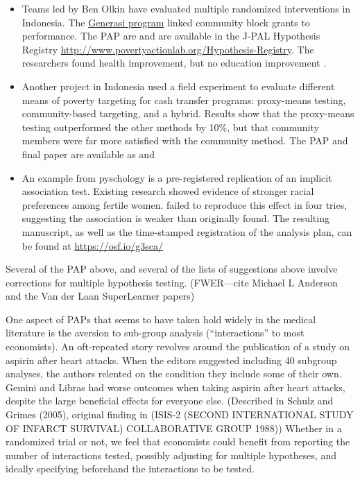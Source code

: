 \documentclass[12pt] {article}
\begin{document}
\begin{itemize}
\item 
Teams led by Ben Olkin have evaluated multiple randomized interventions in Indonesia. The \href{http://www.povertyactionlab.org/evaluation/project-generasi-conditional-community-block-grants-indonesia}{Generasi program} linked community block grants to performance. The PAP are \cite{olken_generasi_2009, olken_generasi_2010} and are available in the J-PAL Hypothesis Registry \url{http://www.povertyactionlab.org/Hypothesis-Registry}. The researchers found health improvement, but no education improvement \cite{olken_indonesias_2010, olken_should_2014}.

\item 
Another project in Indonesia used a field experiment to evaluate different means of poverty targeting for cash transfer programs: proxy-means testing, community-based targeting, and a hybrid. Results show that the proxy-means testing outperformed the other methods by 10\%, but that community members were far more satisfied with the community method. The PAP and final paper are available as \cite{olken_targeting_2009} and \cite{alatas_targeting_2012}

\item
An example from pyschology is a pre-registered replication of an implicit association test. Existing research showed evidence of stronger racial preferences among fertile women. \cite{NosekPreRegistered} failed to reproduce this effect in four tries, suggesting the association is weaker than originally found. The resulting manuscript, as well as the time-stamped registration of the analysis plan, can be found at \url{https://osf.io/g3sca/}
\end{itemize}

Several of the PAP above, and several of the lists of suggestions above involve corrections for multiple hypothesis testing.  (FWER---cite Michael L Anderson
and the Van der Laan SuperLearner papers)

One aspect of PAPs that seems to have taken hold widely in the medical
literature is the aversion to sub-group analysis (``interactions'' to
most economists). An oft-repeated story revolves around the publication
of a study on aspirin after heart attacks. When the editors suggested
including 40 subgroup analyses, the authors relented on the condition
they include some of their own. Gemini and Libras had worse outcomes
when taking aspirin after heart attacks, despite the large beneficial
effects for everyone else. (Described in Schulz and Grimes (2005),
original finding in (ISIS-2 (SECOND INTERNATIONAL STUDY OF INFARCT
SURVIVAL) COLLABORATIVE GROUP 1988)) Whether in a randomized trial or
not, we feel that economists could benefit from reporting the number of
interactions tested, possibly adjusting for multiple hypotheses, and
ideally specifying beforehand the interactions to be tested.
\end{document}
